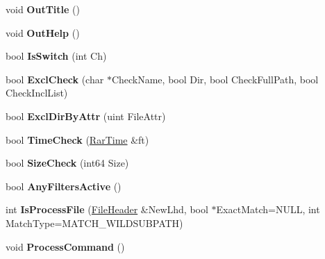 \begin{DoxyCompactItemize}
\item 
\hypertarget{class_command_data_a9e482d22652482c99ac7c8922d26af3f}{void {\bfseries Out\-Title} ()}\label{class_command_data_a9e482d22652482c99ac7c8922d26af3f}

\item 
\hypertarget{class_command_data_a34ea00f5ec9a583b8006c4a4b328bf8c}{void {\bfseries Out\-Help} ()}\label{class_command_data_a34ea00f5ec9a583b8006c4a4b328bf8c}

\item 
\hypertarget{class_command_data_ac544b0af528d04f4d7ffe890980531e2}{bool {\bfseries Is\-Switch} (int Ch)}\label{class_command_data_ac544b0af528d04f4d7ffe890980531e2}

\item 
\hypertarget{class_command_data_aaef8a202792a0f423dc4e64b02ef2e06}{bool {\bfseries Excl\-Check} (char $\ast$Check\-Name, bool Dir, bool Check\-Full\-Path, bool Check\-Incl\-List)}\label{class_command_data_aaef8a202792a0f423dc4e64b02ef2e06}

\item 
\hypertarget{class_command_data_afef640707c5192a4cbb1f7d7083160e2}{bool {\bfseries Excl\-Dir\-By\-Attr} (uint File\-Attr)}\label{class_command_data_afef640707c5192a4cbb1f7d7083160e2}

\item 
\hypertarget{class_command_data_a191bf7d1c9cf0b562f690d27beec2962}{bool {\bfseries Time\-Check} (\hyperlink{class_rar_time}{Rar\-Time} \&ft)}\label{class_command_data_a191bf7d1c9cf0b562f690d27beec2962}

\item 
\hypertarget{class_command_data_a8bf113973a5ce01845d8844a9d8da78a}{bool {\bfseries Size\-Check} (int64 Size)}\label{class_command_data_a8bf113973a5ce01845d8844a9d8da78a}

\item 
\hypertarget{class_command_data_a763c769904166ac782fec361fbe432ab}{bool {\bfseries Any\-Filters\-Active} ()}\label{class_command_data_a763c769904166ac782fec361fbe432ab}

\item 
\hypertarget{class_command_data_a0b202f0e462764cd26bcc5804e9eabdd}{int {\bfseries Is\-Process\-File} (\hyperlink{struct_file_header}{File\-Header} \&New\-Lhd, bool $\ast$Exact\-Match=N\-U\-L\-L, int Match\-Type=M\-A\-T\-C\-H\-\_\-\-W\-I\-L\-D\-S\-U\-B\-P\-A\-T\-H)}\label{class_command_data_a0b202f0e462764cd26bcc5804e9eabdd}

\item 
\hypertarget{class_command_data_ae5592e260e8c12f79780dbb22f8d8ff6}{void {\bfseries Process\-Command} ()}\label{class_command_data_ae5592e260e8c12f79780dbb22f8d8ff6}


\end{DoxyCompactItemize}
